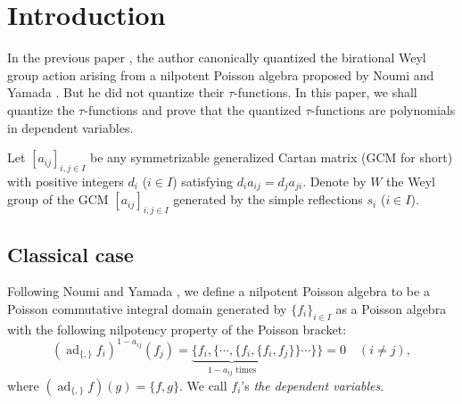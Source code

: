 \documentclass[12pt,twoside]{article}
\newcommand\ad{\mathop{\mathrm{ad}}\nolimits}
\theoremstyle{plain} %
\theoremstyle{definition} %
\theoremstyle{definition} %
\numberwithin{theorem}{section}
\numberwithin{equation}{section}
\numberwithin{figure}{section}
\numberwithin{table}{section}
\begin{document}
\title{\TITLE}
\author{\AUTHOR}
\date{\DATE}
\maketitle
\begin{abstract}
  \ABSTRACT
\end{abstract}
\tableofcontents
\setcounter{section}{-1} %

\section{Introduction}


In the previous paper \cite{Kuroki2008}, the author canonically quantized 
the birational Weyl group action arising from a nilpotent
Poisson algebra proposed by Noumi and Yamada \cite{NY0012028}.
But he did not quantize their $\tau$-functions.
In this paper, we shall quantize the $\tau$-functions and
prove that the quantized $\tau$-functions are polynomials in dependent variables.

Let $[a_{ij}]_{i,j\in I}$ be any symmetrizable generalized Cartan matrix
(GCM for short) with positive integers $d_i$ ($i\in I$) satisfying $d_i a_{ij}=d_j a_{ji}$.
Denote by $W$ the Weyl group of the GCM $[a_{ij}]_{i,j\in I}$
generated by the simple reflections $s_i$ ($i\in I$).


\subsection{Classical case}

Following Noumi and Yamada \cite{NY0012028}, we define a nilpotent Poisson algebra 
to be a Poisson commutative integral domain generated by $\{f_i\}_{i\in I}$ 
as a Poisson algebra with the following nilpotency property of the Poisson bracket:
\begin{equation*}
 (\ad_{\{,\}} f_i)^{1-a_{ij}}(f_j)
 = \underbrace{\{f_i,\{\cdots,\{f_i,\{f_i}_{\text{$1-a_{ij}$ times}},f_j\}\}\cdots\}\}
 = 0
 \quad (i\ne j),
\end{equation*}
where $(\ad_{\{,\}} f)(g)=\{f,g\}$.
We call $f_i$'s {\em the dependent variables}.
\end{document}
